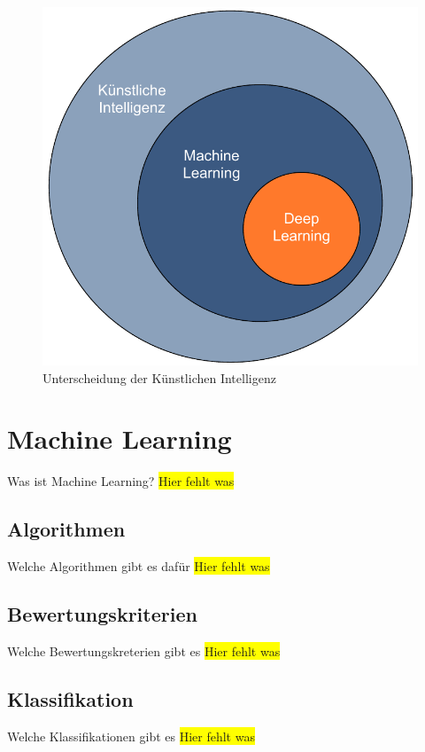 \begin{figure}[h]
    \centering
    \includegraphics[scale=0.6]{images/kapitel_2/kuenstliche_intelligenz.pdf}
    \caption{Unterscheidung der Künstlichen Intelligenz}
    \label{fig:grundlagen_artificialintelligence}
\end{figure}

\section{Machine Learning}
Was ist Machine Learning?
\colorbox{yellow}{Hier fehlt was}

\subsection{Algorithmen}
Welche Algorithmen gibt es dafür
\colorbox{yellow}{Hier fehlt was}

\subsection{Bewertungskriterien}
Welche Bewertungskreterien gibt es
\colorbox{yellow}{Hier fehlt was}

\subsection{Klassifikation}
Welche Klassifikationen gibt es
\colorbox{yellow}{Hier fehlt was}

